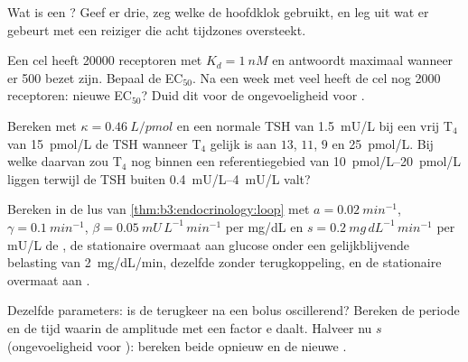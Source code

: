 \begin{exercise}[$\star$]\label{exo:b3:endocrinology:4}
Wat is een ? Geef er drie, zeg welke de hoofdklok gebruikt, en
leg uit wat er gebeurt met een reiziger die acht tijdzones oversteekt.
\end{exercise}

\begin{exercise}[$\star\star$]\label{exo:b3:endocrinology:5}
Een cel heeft \num{20000} receptoren met $K_{d} = \qty{1}{nM}$ en
antwoordt maximaal wanneer er \num{500} bezet zijn. Bepaal de
EC$_{50}$. Na een week met veel  heeft de cel nog \num{2000}
receptoren: nieuwe EC$_{50}$? Duid dit voor de ongevoeligheid voor
.
\end{exercise}

\begin{exercise}[$\star\star$]\label{exo:b3:endocrinology:6}
Bereken met $\kappa = \qty{0.46}{L/pmol}$ en een normale TSH van
\qty{1.5}{mU/L} bij een vrij T$_{4}$ van \qty{15}{pmol/L} de TSH
wanneer T$_{4}$ gelijk is aan $13$, $11$, $9$ en \qty{25}{pmol/L}. Bij
welke daarvan zou T$_{4}$ nog binnen een referentiegebied van
\qtyrange{10}{20}{pmol/L} liggen terwijl de TSH buiten
\qtyrange{0.4}{4}{mU/L} valt?
\end{exercise}

\begin{exercise}[$\star\star$]\label{exo:b3:endocrinology:7}
Bereken in de lus van \cref{thm:b3:endocrinology:loop} met $a = \qty{0.02}{min^{-1}}$,
$\gamma = \qty{0.1}{min^{-1}}$, $\beta = \qty{0.05}{mU\,L^{-1}\,min^{-1}}$
per mg/dL en $s = \qty{0.2}{mg\,dL^{-1}\,min^{-1}}$ per mU/L de
, de stationaire overmaat aan glucose onder een
gelijkblijvende belasting van \qty{2}{mg/dL/min}, dezelfde zonder
terugkoppeling, en de stationaire overmaat aan .
\end{exercise}

\begin{exercise}[$\star\star$]\label{exo:b3:endocrinology:8}
Dezelfde parameters: is de terugkeer na een bolus oscillerend? Bereken
de periode en de tijd waarin de amplitude met een factor $\mathrm{e}$
daalt. Halveer nu $s$ (ongevoeligheid voor ): bereken beide
opnieuw en de nieuwe .
\end{exercise}

